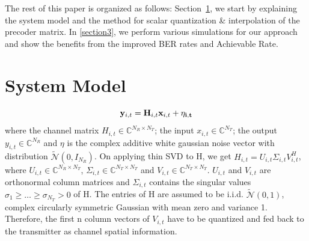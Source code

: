 \documentclass[conference]{IEEEtran}
\begin{document}
The rest of this paper is organized as follows: Section~\ref{section2}, we start by explaining the system model and the method for scalar quantization \& interpolation of the precoder matrix. In \ref{section3}, we perform various simulations for our approach and show the benefits from the improved BER rates and Achievable Rate.



\section{System Model}

\label{section2}
\begin{equation}
{\bf y}_{i,t} = {\bf H}_{i,t} {\bf x}_{i,t}+ \bf{\eta_{i,t}}
\end{equation}
where the channel matrix $H_{i,t} \in \mathbb{C}^{N_R \times N_T}$; the input $x_{i,t} \in \mathbb{C}^{N_T}$; the output $y_{i,t} \in \mathbb{C}^{N_R}$ and $\eta$ is the complex additive white gaussian noise vector with distribution $\tilde{\mathcal{N}}(0,I_{N_R})$. On applying thin SVD to H, we get $H_{i,t} = U_{i,t} \Sigma_{i,t} V_{i,t}^{H}$, where $U_{i,t} \in \mathbb{C}^{N_R \times N_T}$, $\Sigma_{i,t} \in \mathbb{C}^{N_T \times N_T}$  and $V_{i,t} \in \mathbb{C}^{N_T \times N_T}$. $U_{i,t}$ and $V_{i,t}$ are orthonormal column matrices and $\Sigma_{i,t}$ contains the singular values $\sigma_1 \geq \ldots \geq \sigma_{N_T} > 0$ of H. The entries of H are assumed to be i.i.d. $\tilde{\mathcal{N}}(0,1)$, complex circularly symmetric Gaussian with mean zero and variance 1. Therefore, the first n column vectors of $V_{i,t}$ have to be quantized and fed back to the transmitter as channel spatial information.


\end{document}
